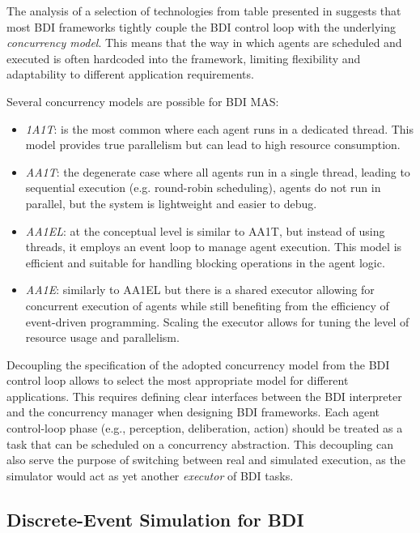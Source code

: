 The analysis of a selection of technologies from table  presented in \cite{DBLP:conf/emas/BaiardiBCPRO24} suggests that most \ac{BDI} frameworks tightly couple the \ac{BDI} control loop with the underlying \emph{concurrency model}. 
%
This means that the way in which agents are scheduled and executed is often hardcoded into the framework, limiting flexibility and adaptability to different application requirements.

Several concurrency models are possible for \ac{BDI} \ac{MAS}: 
\begin{itemize}
    \item \emph{\ac{1A1T}}: is the most common where each agent runs in a dedicated thread. This model provides true parallelism but can lead to high resource consumption. 
    \item \emph{\ac{AA1T}}: the degenerate case where all agents run in a single thread, leading to sequential execution (e.g. round-robin scheduling), agents do not run in parallel, but the system is lightweight and easier to debug.
    \item \emph{\ac{AA1EL}}: at the conceptual level is similar to \ac{AA1T}, but instead of using threads, it employs an event loop to manage agent execution. This model is efficient and suitable for handling blocking operations in the agent logic.
    \item \emph{\ac{AA1E}}: similarly to \ac{AA1EL} but there is a shared executor allowing for concurrent execution of agents while still benefiting from the efficiency of event-driven programming. Scaling the executor allows for tuning the level of resource usage and parallelism.
\end{itemize}

Decoupling the specification of the adopted concurrency model from the \ac{BDI} control loop allows to select the most appropriate model for different applications.
%
This requires defining clear interfaces between the \ac{BDI} interpreter and the concurrency manager when designing \ac{BDI} frameworks.
%
Each agent control-loop phase (e.g., perception, deliberation, action) should be treated as a task that can be scheduled on a concurrency abstraction.
%
This decoupling can also serve the purpose of switching between real and simulated execution, as the simulator would act as yet another \emph{executor} of \ac{BDI} tasks.

\subsection{Discrete-Event Simulation for BDI}

